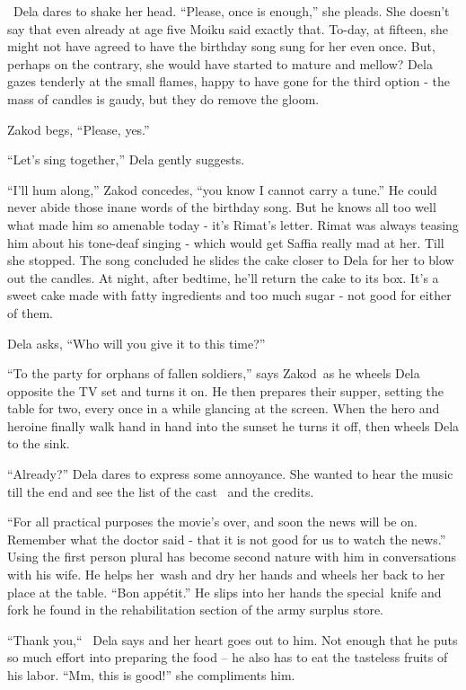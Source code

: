 \documentclass[twoside,11pt]{book}
\begin{document}
~Dela dares to shake her head. ``Please, once is enough,'' she pleads. She doesn't say that
even already at age five Moiku said exactly that. To-day, at fifteen, she might not have agreed to have the birthday
song sung for her even once. But, perhaps on the contrary, she would have started to mature and mellow? Dela gazes
tenderly at the small flames, happy to have gone for the third option - the mass of candles is gaudy, but they do
remove the gloom.

Zakod begs, ``Please, yes.''

``Let's sing together,'' Dela gently suggests.

``I'll hum along,'' Zakod concedes, ``you know I cannot carry a
tune.'' He could never abide those inane words of the birthday song. But he knows all too well what made
him so amenable today - it's Rimat's letter. Rimat was always teasing him about his tone-deaf singing - which would get
Saffia really mad at her. Till she stopped. The song concluded he slides the cake closer to Dela for her to blow out
the candles. At night, after bedtime, he'll return the cake to its box. It's a sweet cake made with fatty ingredients
and too much sugar - not good for either of them.

Dela asks, ``Who will you give it to this time?''

``To the party for orphans of fallen soldiers,'' says Zakod~as he wheels Dela opposite the TV
set and turns it on. He then prepares their supper, setting the table for two, every once in a while glancing at the
screen. When the hero and heroine finally walk hand in hand into the sunset he turns it off, then wheels Dela to the
sink.

``Already?'' Dela dares to express some annoyance. She wanted to hear the music till the end
and see the list of the cast \ and the credits.

``For all practical purposes the movie's over, and soon the news will be on. Remember what the doctor said
- that it is not good for us to watch the news.'' Using the first person plural has become second nature
with him in conversations with his wife. He helps her~wash and dry her hands and wheels her back to her place at the
table. ``Bon app\'etit.'' He slips into her hands the special~knife and fork he found in the
rehabilitation section of the army surplus store.

``Thank you,``~ Dela says and her heart goes out to him. Not enough that he puts so much
effort into preparing the food -- he also has to eat the tasteless fruits of his labor. ``Mm, this is
good!'' she compliments him.
\end{document}
